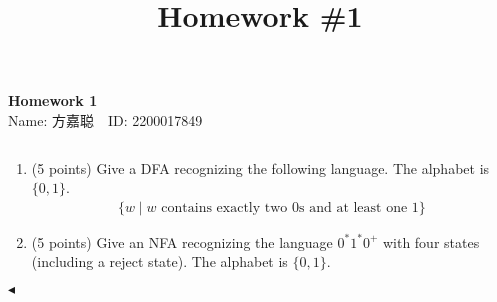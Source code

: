 \documentclass[11pt]{article}
\title{Homework \#1}
\newenvironment{problem}[2][Problem]{\begin{trivlist}
\item[\hskip \labelsep{\bfseries#1}\hskip\labelsep{\bfseries#2.}]}{\hfill$\blacktriangleleft$\end{trivlist}}
\begin{document}
\kaishu

\pagestyle{fancy}
\chead{}

\begin{center}
    {\LARGE \bf Homework 1}\\
    {Name: 方嘉聪\ \  ID: 2200017849}            %
\end{center}

\begin{problem}{1.(10 points)}
    $~$
\begin{enumerate}[label = (\alph*)]
    \item (5 points) Give a DFA recognizing the following language. The alphabet is $\{0, 1\}$.
    \begin{align*}
        \{w \mid w \mbox{ contains exactly two }0\mbox{s and at least one }1\}
    \end{align*}
    \item (5 points) Give an NFA recognizing the language $0^*1^*0^+$ with four states (including a reject state). The alphabet is $\{0, 1\}$.
\end{enumerate}
\end{problem}
\end{document}
